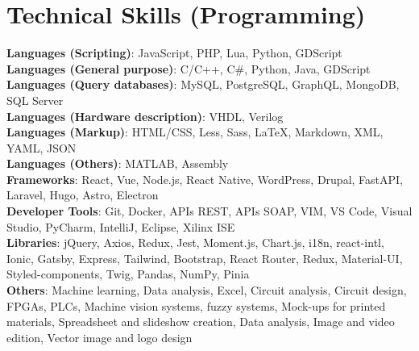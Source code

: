 \documentclass[letterpaper,11pt]{article}
\makeatletter
\newcommand{\resumeItem}[1]{
  \item\small{
    {#1 \vspace{-2pt}}
  }
}
\newcommand{\resumeProjectHeading}[2]{
    \item
    \begin{tabular*}{0.97\textwidth}{l@{\extracolsep{\fill}}r}
      \small#1 & #2 \\
    \end{tabular*}\vspace{-7pt}
}
\newcommand{\resumeSubHeadingListStart}{\begin{itemize}[leftmargin=0.15in, label={}]}
\newcommand{\resumeSubHeadingListEnd}{\end{itemize}}
\newcommand{\resumeItemListStart}{\begin{itemize}}
\newcommand{\resumeItemListEnd}{\end{itemize}\vspace{-5pt}}
\makeatother
\begin{document}

\section{Technical Skills (Programming)}
\begin{itemize}[leftmargin=0.15in, label={}, itemsep=2pt, parsep=2pt]
  \small{\item{
    \textbf{Languages (Scripting)}{: JavaScript, PHP, Lua, Python, GDScript} \\
    \textbf{Languages (General purpose)}{: C/C++, C\#, Python, Java, GDScript} \\
    \textbf{Languages (Query databases)}{: MySQL, PostgreSQL, GraphQL, MongoDB, SQL Server} \\
    \textbf{Languages (Hardware description)}{: VHDL, Verilog} \\
    \textbf{Languages (Markup)}{: HTML/CSS, Less, Sass, LaTeX, Markdown, XML, YAML, JSON} \\
    \textbf{Languages (Others)}{: MATLAB, Assembly} \\
    \textbf{Frameworks}{: React, Vue, Node.js, React Native, WordPress, Drupal, FastAPI, Laravel, Hugo, Astro, Electron} \\
    \textbf{Developer Tools}{: Git, Docker, APIs REST, APIs SOAP, VIM, VS Code, Visual Studio, PyCharm, IntelliJ, Eclipse, Xilinx ISE} \\
    \textbf{Libraries}{: jQuery, Axios, Redux, Jest, Moment.js, Chart.js, i18n, react-intl, Ionic, Gatsby, Express, Tailwind, Bootstrap, React Router, Redux, Material-UI, Styled-components, Twig, Pandas, NumPy, Pinia} \\
    \textbf{Others}{: Machine learning, Data analysis, Excel, Circuit analysis, Circuit design, FPGAs, PLCs, Machine vision systems, fuzzy systems, Mock-ups for printed materials, Spreadsheet and slideshow creation, Data analysis, Image and video edition, Vector image and logo design} \
  }}
\end{itemize}
\end{document}
